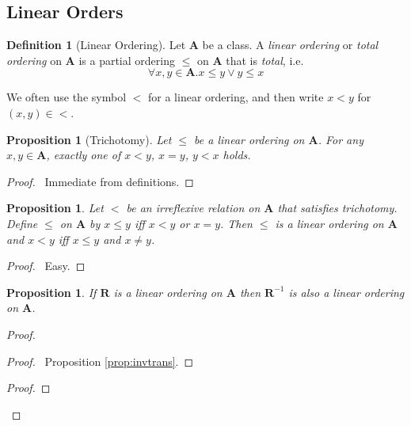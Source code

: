 \documentclass{book}
\let\qed\relax
\newtheorem{prop}[ax]{Proposition}
\theoremstyle{definition}
\newtheorem{df}[ax]{Definition}
\begin{document}
\subsection{Linear Orders}

\begin{df}[Linear Ordering]
Let $\mathbf{A}$ be a class. A \emph{linear ordering} or \emph{total ordering} on $\mathbf{A}$ is a partial ordering $\leq$ on $\mathbf{A}$ that is \emph{total}, i.e.
\[ \forall x,y \in \mathbf{A}. x \leq y \vee y \leq x \]

We often use the symbol $<$ for a linear ordering, and then write $x < y$ for $(x,y) \in <$.
\end{df}

\begin{prop}[Trichotomy]
Let $\leq$ be a linear ordering on $\mathbf{A}$. For any $x,y \in \mathbf{A}$, exactly one of $x < y$, $x = y$, $y < x$ holds.
\end{prop}

\begin{proof}
\pf\ Immediate from definitions. \qed
\end{proof}

\begin{prop}
Let $<$ be an irreflexive relation on $\mathbf{A}$ that satisfies trichotomy. Define $\leq$ on $\mathbf{A}$ by $x \leq y$ iff $x < y$ or $x = y$. Then $\leq$ is a linear ordering on $\mathbf{A}$ and $x < y$ iff $x \leq y$ and $x \neq y$.
\end{prop}

\begin{proof}
\pf\ Easy. \qed
\end{proof}

\begin{prop}
If $\mathbf{R}$ is a linear ordering on $\mathbf{A}$ then $\mathbf{R}^{-1}$ is also a linear ordering on $\mathbf{A}$.
\end{prop}

\begin{proof}
\pf
{}
\begin{proof}
	\pf\ Proposition \ref{prop:invtrans}.
\end{proof}
\begin{proof}
\end{proof}
\qed
\end{proof}
\end{document}
